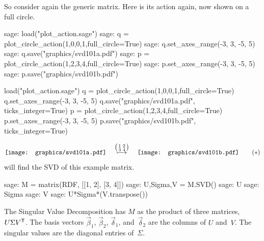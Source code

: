 So consider again the generic matrix.
Here is its action again, now shown
on a full circle.
\begin{sagecommandline}
sage: load("plot_action.sage")
sage: q = plot_circle_action(1,0,0,1,full_circle=True) 
sage: q.set_axes_range(-3, 3, -5, 5) 
sage: q.save("graphics/svd101a.pdf")
sage: p = plot_circle_action(1,2,3,4,full_circle=True) 
sage: p.set_axes_range(-3, 3, -5, 5) 
sage: p.save("graphics/svd101b.pdf")
\end{sagecommandline}
\begin{sagesilent}
load("plot_action.sage")
q = plot_circle_action(1,0,0,1,full_circle=True) 
q.set_axes_range(-3, 3, -5, 5) 
q.save("graphics/svd101a.pdf", ticks_integer=True)
p = plot_circle_action(1,2,3,4,full_circle=True) 
p.set_axes_range(-3, 3, -5, 5) 
p.save("graphics/svd101b.pdf", ticks_integer=True)
\end{sagesilent}
\begin{equation*}
  \vcenteredhbox{\texttt{[image: graphics/svd101a.pdf]}}
  \quad\mapsunder{\big (\begin{smallmatrix} 1 &2 \\ 3 &4 \end{smallmatrix}\big )}\quad
  \vcenteredhbox{\texttt{[image: graphics/svd101b.pdf]}}
  \tag{$*$}
\end{equation*}
\Sage{} will find the SVD of this example matrix.
\begin{sagecommandline}
sage: M = matrix(RDF, [[1, 2], [3, 4]])
sage: U,Sigma,V = M.SVD()
sage: U
sage: Sigma
sage: V
sage: U*Sigma*(V.transpose())
\end{sagecommandline}
\noindent 
The Singular Value Decomposition has $M$ as the product of
three matrices, $U\Sigma{{V}^{\mathsf{T}}}$.
The basis vectors $\vec{\beta}_1$, $\vec{\beta}_2$, $\vec{\delta}_1$, 
and~$\vec{\delta}_2$ are the columns of $U$ and~$V$. 
The singular values are the diagonal entries of~$\Sigma$.

